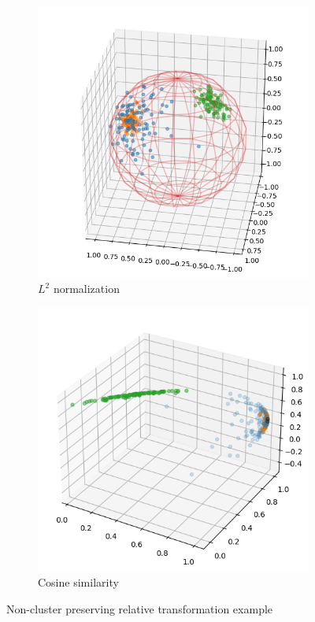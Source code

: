 \documentclass[../main.tex]{subfiles}
\begin{document}
\begin{figure}[ht!]
\begin{subfigure}[b]{0.45\textwidth}
         \includegraphics[width=\textwidth]{figures/rs/clusters_2.png}
        \caption{$L^2$ normalization}
         \label{fig:rel_ex_2}
     \end{subfigure}
     \begin{subfigure}[b]{0.45\textwidth}
         \centering
         \includegraphics[width=\textwidth]{figures/rs/clusters_3.png}
        \caption{Cosine similarity}
         \label{fig:rel_ex_3}
     \end{subfigure}
    \caption{Non-cluster preserving relative transformation example}
    \label{fig:rel_ex_bad}
\end{figure}
\end{document}
